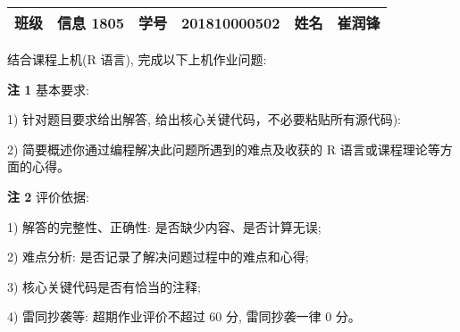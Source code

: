\documentclass{ctexrep}
\begin{document}
\fancypage{\fbox}{}
\begin{table}[h]
\begin{tabularx}{\textwidth}{l|l|l|l|l|l}
    \bfseries{班级\qquad\qquad} & 信息 1805 & \bfseries{学号\qquad\qquad} & 201810000502 & \bfseries{姓名\qquad\qquad} & 崔润锋 \\
    \hline\hline
\end{tabularx}
\end{table}
\begin{flushleft}
结合课程上机(R 语言), 完成以下上机作业问题: 

{\bfseries{注 1}} 基本要求: 

1) 针对题目要求给出解答, 给出核心关键代码，不必要粘贴所有源代码): 

2) 简要概述你通过编程解决此问题所遇到的难点及收获的 R 语言或课程理论等方面的心得。 

{\bfseries{注 2}} 评价依据: 

1) 解答的完整性、正确性: 是否缺少内容、是否计算无误;     

2) 难点分析: 是否记录了解决问题过程中的难点和心得;     

3) 核心关键代码是否有恰当的注释;     

4) 雷同抄袭等: 超期作业评价不超过 60 分, 雷同抄袭一律 0 分。     
\end{flushleft}
\end{document}
